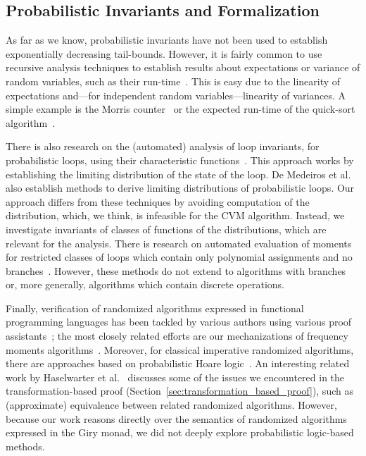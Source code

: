 \subsection{Probabilistic Invariants and Formalization}
As far as we know, probabilistic invariants have not been used to establish exponentially decreasing tail-bounds.
However, it is fairly common to use recursive analysis techniques to establish results about expectations or variance of random variables, such as their run-time~\cite[Section 1.4]{motwani1995}.
This is easy due to the linearity of expectations and---for independent random variables---linearity of variances.
A simple example is the Morris counter~\cite{morris1978} or the expected run-time of the quick-sort algorithm~\cite[Section 2.5]{mitzenmacher2017}.

There is also research on the (automated) analysis of loop invariants, for probabilistic loops, using their characteristic functions~\cite{batz2023, mciver2005}.
This approach works by establishing the limiting distribution of the state of the loop.
De Medeiros et al.~\cite[Section 3.2]{demedeiros2024} also establish methods to derive limiting distributions of probabilistic loops.
Our approach differs from these techniques by avoiding computation of the distribution, which, we think, is infeasible for the CVM algorithm.
Instead, we investigate invariants of classes of functions of the distributions, which are relevant for the analysis.
There is research on automated evaluation of moments for restricted classes of loops which contain only polynomial assignments and no branches~\cite{bartocci2019,kofnov2022}.
However, these methods do not extend to algorithms with branches or, more generally, algorithms which contain discrete operations.

Finally, verification of randomized algorithms expressed in functional programming languages has been tackled by various authors using various proof assistants~\cite{audebaud2009,bosshard2024,demedeiros2024, eberl2020,gopinathan20,hurd03, Probabilistic_Prime_Tests-AFP, tan2024, tassarotti2021}; the most closely related efforts are our mechanizations of frequency moments algorithms~\cite{karayel2022, karayel2023}.
Moreover, for classical imperative randomized algorithms, there are approaches based on probabilistic Hoare logic~\cite{denhartog2002}.
An interesting related work by Haselwarter et al.~\cite{haselwarter2025} discusses some of the issues we encountered in the transformation-based proof (Section~\ref{sec:transformation_based_proof}), such as (approximate) equivalence between related randomized algorithms.
However, because our work reasons directly over the semantics of randomized algorithms expressed in the Giry monad, we did not deeply explore probabilistic logic-based methods.
